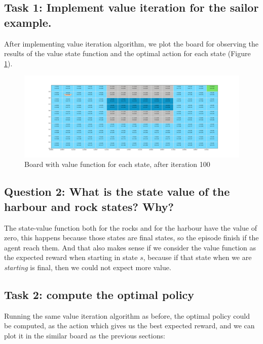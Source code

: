 \documentclass[12pt]{article}
\begin{document}
\subsection{Task 1: Implement value iteration for the sailor example.}

After implementing value iteration algorithm, we plot the board for observing the results of the value state function and the optimal action for each state (Figure \ref{fig:my_label}).

\begin{figure}[h]
    \centering
    \includegraphics[scale=0.28]{exercise-2/report/img/final-board.png}
    \caption{Board with value function for each state, after iteration 100}
    \label{fig:my_label}
\end{figure}

\subsection{Question 2: What is the state value of the harbour and rock states? Why?}

The state-value function both for the rocks and for the harbour have the value of zero, this happens because those states are final states, so the episode finish if the agent reach them. And that also makes sense if we consider the value function as the expected reward when starting in state $s$, because if that state when we are \textit{starting} is final, then we could not expect more value.

\subsection{Task 2: compute the optimal policy}

Running the same value iteration algorithm as before, the optimal policy could be computed, as the action which gives us the best expected reward, and we can plot it in the similar board as the previous sections:




\end{document}
